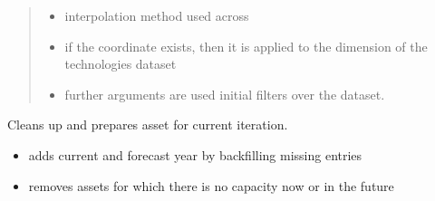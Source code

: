 \documentclass[letterpaper,10pt,english]{sphinxmanual}
\begin{document}
\begin{fulllineitems}
\begin{quote}
\begin{description}
\begin{itemize}
\item {} 
 \textendash{} interpolation method used across 

\item {} 
 \textendash{} if the coordinate  exists, then it is
applied to the  dimension of the technologies dataset

\item {} 
 \textendash{} further arguments are used initial filters over the
 dataset.

\end{itemize}

\end{description}\end{quote}

\end{fulllineitems}


\begin{fulllineitems}
\label{\detokenize{api:muse.utilities.clean_assets}}
Cleans up and prepares asset for current iteration.
\begin{itemize}
\item {} 
adds current and forecast year by backfilling missing entries

\item {} 
removes assets for which there is no capacity now or in the future

\end{itemize}

\end{fulllineitems}

\end{document}
